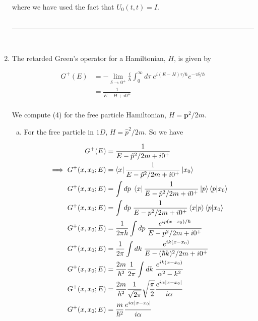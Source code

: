 \documentclass[]{article}
\begin{document}
\begin{enumerate}[1)]
where we have used the fact that $U_0(t,t) = I$. \\

\hfill \\
\noindent\rule{15cm}{0.4pt} \\


\item The retarded Green's operator for a Hamiltonian, $H$, is given by

\begin{equation}
\begin{split}
G^+(E) &=  - \lim_{\delta \to 0^+}  \frac{i}{\hbar} \int_{0}^{\infty} d\tau \; e^{i(E-H)\tau/\hbar} e^{-\tau\delta/\hbar} \\
& = \frac{1}{E - H + i0^+} \\
\end{split}
\end{equation}

We compute (4) for the free particle Hamiltonian, $H = \bm{p}^2/2m$. \\

\begin{enumerate}[a)]

\item For the free particle in $1D$, $H = \hat{p}^2/2m$. So we have

\begin{equation}
\begin{split}
G^+(E) & = \frac{1}{E -  \hat{p}^2/2m + i0^+} \\
\implies G^+(x,x_0 ; E) & = \bra{x}  \frac{1}{E -  \hat{p}^2/2m + i0^+} \ket{x_0} \\
G^+(x,x_0 ; E) & = \int dp \;\bra{x}  \frac{1}{E -  \hat{p}^2/2m + i0^+} \ket{p}\braket{p}{x_0} \\
G^+(x,x_0 ; E) & = \int dp \;  \frac{1}{E -  p^2/2m + i0^+} \braket{x}{p}  \braket{p}{x_0} \\
G^+(x,x_0 ; E) & = \frac{1}{ 2\pi \hbar }\int dp \;  \frac{ e^{ ip(x-x_0)/\hbar  }}{E -  p^2/2m + i0^+}\\
G^+(x,x_0 ; E) & = \frac{1}{ 2\pi } \int dk \;  \frac{ e^{ ik(x-x_0)  }}{E -  (\hbar k)^2/2m + i0^+}\\
G^+(x,x_0 ; E) & =  \frac{2m}{\hbar^2} \frac{1}{ 2\pi }  \int dk \;  \frac{ e^{ ik(x-x_0)  }}{ \alpha^2 -  k^2}\\
G^+(x,x_0 ; E) & =  \frac{2m}{\hbar^2} \frac{1}{ \sqrt{ 2\pi } }  \sqrt{ \frac{\pi}{2}  } \frac{ e^{i\alpha |x - x_0|}  }{i \alpha} \\
G^+(x,x_0 ; E) & =  \frac{m}{\hbar^2} \frac{ e^{i\alpha |x - x_0|}  }{i \alpha} \\
\end{split}
\end{equation}


\end{enumerate}
\end{enumerate}
\end{document}
